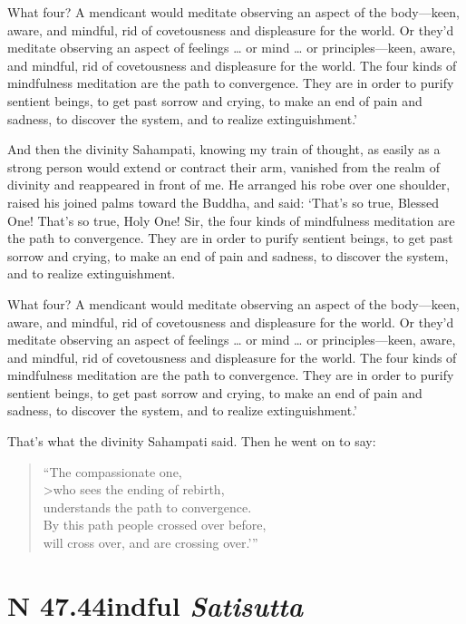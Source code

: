 \documentclass[12pt,openany]{book}%
\newcommand*{\suttatitleacronym}[1]{\smaller[2]{#1}\vspace*{.3em}}
\newcommand*{\suttatitletranslation}[1]{\linebreak{#1}}
\newcommand*{\suttatitleroot}[1]{\linebreak\smaller[2]\itshape{#1}}
\newcommand*{\tocacronym}[1]{\hspace*{-3.3em}{#1}\quad}
\newcommand*{\toctranslation}[1]{#1}
\newcommand*{\tocroot}[1]{(\textit{#1})}
\begin{document}
What four? A mendicant would meditate observing an aspect of the body—keen, aware, and mindful, rid of covetousness and displeasure for the world. Or they’d meditate observing an aspect of feelings … or mind … or principles—keen, aware, and mindful, rid of covetousness and displeasure for the world. The four kinds of mindfulness meditation are the path to convergence. They are in order to purify sentient beings, to get past sorrow and crying, to make an end of pain and sadness, to discover the system, and to realize extinguishment.’ 

And then the divinity Sahampati, knowing my train of thought, as easily as a strong person would extend or contract their arm, vanished from the realm of divinity and reappeared in front of me. He arranged his robe over one shoulder, raised his joined palms toward the Buddha, and said: ‘That’s so true, Blessed One! That’s so true, Holy One! Sir, the four kinds of mindfulness meditation are the path to convergence. They are in order to purify sentient beings, to get past sorrow and crying, to make an end of pain and sadness, to discover the system, and to realize extinguishment. 

What four? A mendicant would meditate observing an aspect of the body—keen, aware, and mindful, rid of covetousness and displeasure for the world. Or they’d meditate observing an aspect of feelings … or mind … or principles—keen, aware, and mindful, rid of covetousness and displeasure for the world. The four kinds of mindfulness meditation are the path to convergence. They are in order to purify sentient beings, to get past sorrow and crying, to make an end of pain and sadness, to discover the system, and to realize extinguishment.’ 

That’s what the divinity Sahampati said. Then he went on to say: 

\begin{verse}%
“The compassionate one, \\>who sees the ending of rebirth, \\
understands the path to convergence. \\
By this path people crossed over before, \\
will cross over, and are crossing over.’” 

%
\end{verse}

%
\section*{{\suttatitleacronym SN 47.44}{\suttatitletranslation Mindful }{\suttatitleroot Satisutta}}
\addcontentsline{toc}{section}{\tocacronym{SN 47.44} \toctranslation{Mindful } \tocroot{Satisutta}}
\end{document}
